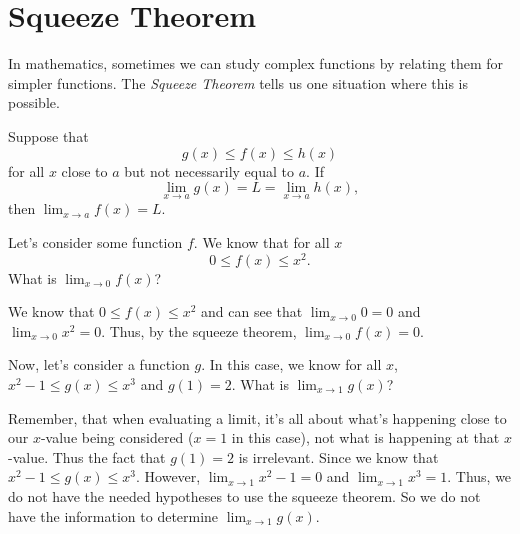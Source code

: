 \documentclass{ximera}
\begin{document}
\section{Squeeze Theorem}

In mathematics, sometimes we can study complex functions by relating
them for simpler functions. The \textit{Squeeze Theorem} tells us one
situation where this is possible.

\begin{theorem}
  Suppose that
  \[
  g(x) \le f(x) \le h(x)
  \]
  for all $x$ close to $a$ but not necessarily equal to $a$. If
  \[
  \lim_{x\to a} g(x) = L = \lim_{x\to a} h(x),
  \]
  then $\lim_{x\to a} f(x) = L$.
\end{theorem}

\begin{question}
  Let's consider some function $f$. We know that for all $x$
  \[
  0 \le f(x) \le x^2.
  \]
  What is $\lim_{x\to 0} f(x)$?
  \begin{prompt}
  \begin{multipleChoice}
  \end{multipleChoice}
  \end{prompt}
  \begin{explanation}
      We know that $0 \le f(x) \le x^2$ and can see that $\lim_{x\to 0} 0=0$ and $\lim_{x\to 0} x^2=0$. Thus, by the squeeze theorem, $\lim_{x\to 0} f(x)=0$.
  \end{explanation}
\end{question}

\begin{question}
    Now, let's consider a function $g$. In this case, we know for all $x$, $x^2-1\leq g(x)\leq x^3$ and $g(1)=2$. What is $\lim_{x\to 1}g(x)$?

 \begin{prompt}
  \begin{multipleChoice}
  \end{multipleChoice}
  \end{prompt}
  \begin{explanation}
      Remember, that when evaluating a limit, it's all about what's happening close to our $x$-value being considered ($x=1$ in this case), not what is happening at that $x$-value. Thus the fact that $g(1)=2$ is irrelevant. Since we know that $x^2-1\leq g(x)\leq x^3$. However, $\lim_{x\to 1} x^2-1=0$ and $\lim_{x\to 1} x^3=1$. Thus, we do not have the needed hypotheses to use the squeeze theorem. So we do not have the information to determine $\lim_{x\to 1}g(x)$.
  \end{explanation}
\end{question}
\end{document}
